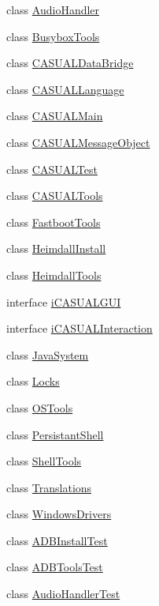 \begin{DoxyCompactItemize}
\item 
class \hyperlink{classCASUAL_1_1AudioHandler}{Audio\-Handler}
\item 
class \hyperlink{classCASUAL_1_1BusyboxTools}{Busybox\-Tools}
\item 
class \hyperlink{classCASUAL_1_1CASUALDataBridge}{C\-A\-S\-U\-A\-L\-Data\-Bridge}
\item 
class \hyperlink{classCASUAL_1_1CASUALLanguage}{C\-A\-S\-U\-A\-L\-Language}
\item 
class \hyperlink{classCASUAL_1_1CASUALMain}{C\-A\-S\-U\-A\-L\-Main}
\item 
class \hyperlink{classCASUAL_1_1CASUALMessageObject}{C\-A\-S\-U\-A\-L\-Message\-Object}
\item 
class \hyperlink{classCASUAL_1_1CASUALTest}{C\-A\-S\-U\-A\-L\-Test}
\item 
class \hyperlink{classCASUAL_1_1CASUALTools}{C\-A\-S\-U\-A\-L\-Tools}
\item 
class \hyperlink{classCASUAL_1_1FastbootTools}{Fastboot\-Tools}
\item 
class \hyperlink{classCASUAL_1_1HeimdallInstall}{Heimdall\-Install}
\item 
class \hyperlink{classCASUAL_1_1HeimdallTools}{Heimdall\-Tools}
\item 
interface \hyperlink{interfaceCASUAL_1_1iCASUALGUI}{i\-C\-A\-S\-U\-A\-L\-G\-U\-I}
\item 
interface \hyperlink{interfaceCASUAL_1_1iCASUALInteraction}{i\-C\-A\-S\-U\-A\-L\-Interaction}
\item 
class \hyperlink{classCASUAL_1_1JavaSystem}{Java\-System}
\item 
class \hyperlink{classCASUAL_1_1Locks}{Locks}
\item 
class \hyperlink{classCASUAL_1_1OSTools}{O\-S\-Tools}
\item 
class \hyperlink{classCASUAL_1_1PersistantShell}{Persistant\-Shell}
\item 
class \hyperlink{classCASUAL_1_1ShellTools}{Shell\-Tools}
\item 
class \hyperlink{classCASUAL_1_1Translations}{Translations}
\item 
class \hyperlink{classCASUAL_1_1WindowsDrivers}{Windows\-Drivers}
\item 
class \hyperlink{classCASUAL_1_1ADBInstallTest}{A\-D\-B\-Install\-Test}
\item 
class \hyperlink{classCASUAL_1_1ADBToolsTest}{A\-D\-B\-Tools\-Test}
\item 
class \hyperlink{classCASUAL_1_1AudioHandlerTest}{Audio\-Handler\-Test}

\end{DoxyCompactItemize}
